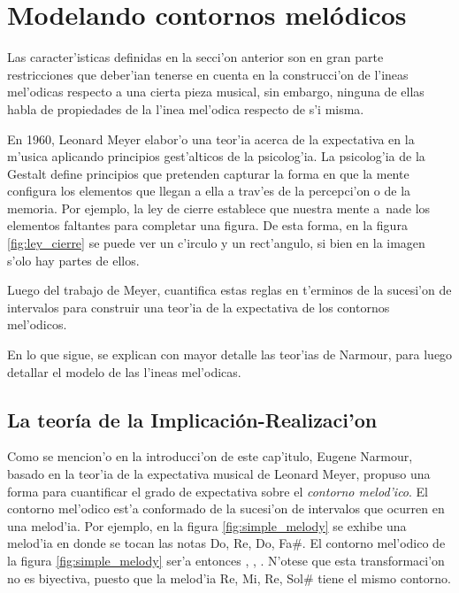 \section{Modelando contornos mel\'odicos}
\label{sec:melodic_contour}
Las caracter'isticas definidas en la secci'on anterior son en gran parte restricciones que deber'ian tenerse en cuenta en la construcci'on 
de l'ineas mel'odicas respecto a una cierta pieza musical, sin embargo, ninguna de ellas habla de propiedades de la l'inea mel'odica 
respecto de s'i misma.

En 1960, Leonard Meyer elabor'o una teor'ia acerca de la expectativa en la m'usica aplicando principios gest'alticos de la psicolog'ia. La 
psicolog'ia de la Gestalt define principios que pretenden capturar la forma en que la mente configura los elementos que llegan a ella a trav'es 
de la percepci'on o de la memoria. Por ejemplo, la ley de cierre establece que nuestra mente a~nade los elementos faltantes para completar una 
figura. De esta forma, en la figura \ref{fig:ley_cierre} se puede ver un c'irculo y un rect'angulo, si bien en la imagen s'olo hay partes de ellos.

\begin{imagen}
    \width{6cm}
\end{imagen}

Luego del trabajo de Meyer, \cite{Narmour91} cuantifica estas reglas en t'erminos de la sucesi'on de intervalos para construir una teor'ia de 
la expectativa de los contornos mel'odicos. 

En lo que sigue, se explican con mayor detalle las teor'ias de Narmour, para luego detallar el modelo de las l'ineas mel'odicas.

\subsection{La teor\'ia de la Implicaci\'on-Realizaci'on}
Como se mencion'o en la introducci'on de este cap'itulo, Eugene Narmour, basado en la teor'ia de la expectativa musical de Leonard Meyer, propuso una forma para cuantificar
el grado de expectativa sobre el \emph{contorno melod'ico}. El contorno mel'odico est'a conformado de la sucesi'on de intervalos que ocurren en una melod'ia. Por ejemplo, 
en la figura \ref{fig:simple_melody} se exhibe una melod'ia en donde se tocan las notas Do, Re, Do, Fa\#. 
El contorno mel'odico de la figura \ref{fig:simple_melody} ser'a entonces , , .
N'otese que esta transformaci'on no es biyectiva, puesto que la melod'ia Re, Mi, Re, Sol\# tiene el mismo contorno.

